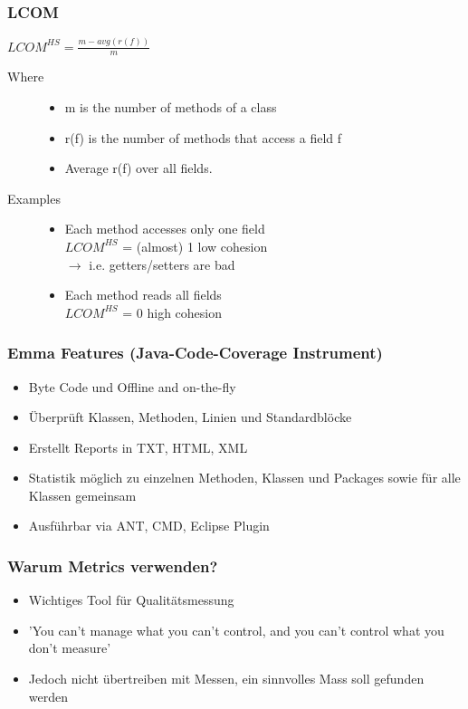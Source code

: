 \documentclass[a4paper,10pt]{article}
\newcommand{\ra}{\rightarrow}
\begin{document}
\subsubsection{LCOM}
$LCOM^{HS} = \frac{m-avg(r(f))}{m}$
\begin{description}
	\item[Where] \hfill
		\begin{itemize}
			\item m is the number of methods of a class
			\item r(f) is the number of methods that access a field f
			\item Average r(f) over all fields.
		\end{itemize}
	\item[Examples] \hfill
		\begin{itemize}
			\item Each method accesses only one field \\
				$LCOM^{HS}$ = (almost) 1 low cohesion \\
				$\ra$ i.e. getters/setters are bad
			\item Each method reads all fields \\
				$LCOM^{HS}$ = 0 high cohesion
		\end{itemize}
\end{description}

\subsubsection{Emma Features (Java-Code-Coverage Instrument)}
\begin{itemize}
\item Byte Code und Offline and on-the-fly
\item Überprüft Klassen, Methoden, Linien und Standardblöcke
\item Erstellt Reports in TXT, HTML, XML
\item Statistik möglich zu einzelnen Methoden, Klassen und Packages sowie für alle Klassen gemeinsam
\item Ausführbar via ANT, CMD, Eclipse Plugin
\end{itemize}

\subsubsection{Warum Metrics verwenden?}
\begin{itemize}
\item Wichtiges Tool für Qualitätsmessung
\item 'You can't manage what you can't control, and you can't control what you don't measure'
\item Jedoch nicht übertreiben mit Messen, ein sinnvolles Mass soll gefunden werden
\end{itemize}
\end{document}
